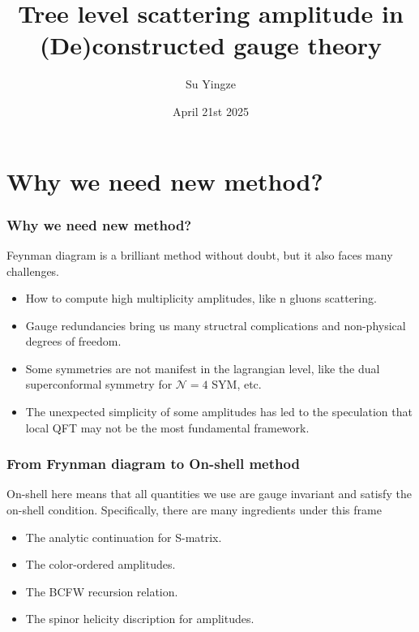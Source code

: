 \documentclass{beamer}
\title[Application of BCFW]{Tree level scattering amplitude in (De)constructed gauge theory}
\author{Su Yingze}
\institute{Nagoya University}
\date[4 21st 2025]{April 21st 2025}
\begin{document}
\frame{\titlepage}
\section{Why we need new method?}
\begin{frame}
    \frametitle{Why we need new method?}
    Feynman diagram is a brilliant method without doubt, but it also faces many challenges.
    \begin{itemize}
        \item How to compute high multiplicity amplitudes, like n gluons scattering.
        \item Gauge redundancies bring us many structral complications and non-physical degrees of freedom.
        \item Some symmetries are not manifest in the lagrangian level, like the dual superconformal symmetry for $\mathcal{N}=4$ SYM, etc.
        \item The unexpected simplicity of some amplitudes has led to the speculation that local QFT may not 
        be the most fundamental framework.
    \end{itemize}
\end{frame}
\begin{frame}
    \frametitle{From Frynman diagram to On-shell method}
    On-shell here means that all quantities we use are gauge invariant and satisfy the on-shell condition.
    Specifically, there are many ingredients under this frame
    \begin{itemize}
        \item The analytic continuation for S-matrix.
        \item The color-ordered amplitudes.
        \item The BCFW recursion relation.
        \item The spinor helicity discription for amplitudes.
    \end{itemize}
\end{frame}
\end{document}
